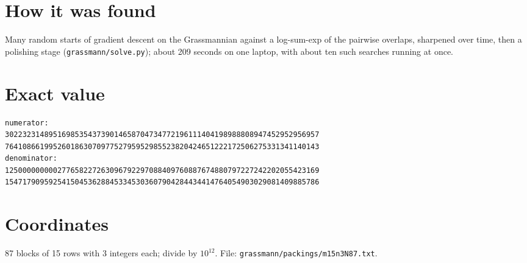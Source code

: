 \documentclass[11pt,a4paper]{article}
\begin{document}
\section{How it was found}
Many random starts of gradient descent on the Grassmannian against a log-sum-exp of the pairwise overlaps, sharpened over time, then a polishing stage (\texttt{grassmann/solve.py}); about 209 seconds on one laptop, with about ten such searches running at once.


\appendix
\section{Exact value}
{\small
\begin{verbatim}
numerator:
302232314895169853543739014658704734772196111404198988808947452952956957
764108661995260186307097752795952985523820424651222172506275331341140143
denominator:
125000000000277658227263096792297088409760887674880797227242202055423169
154717909592541504536288453345303607904284434414764054903029081409885786
\end{verbatim}}

\section{Coordinates}
87 blocks of 15 rows with 3 integers each; divide by $10^{12}$. File: \texttt{grassmann/packings/m15n3N87.txt}.
{\tiny
\begin{multicols}{3}
\end{multicols}}
\end{document}
